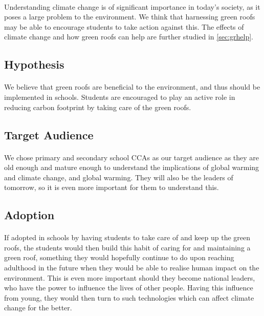 \documentclass[a4paper]{article}
\begin{document}
\begin{multicols}{2}
  \paragraph{} Understanding climate change is of significant importance
  in today's society, as it poses a large problem to the environment.
  We think that harnessing green roofs may be able to encourage students
  to take action against this. The effects of climate change and how green
  roofs can help are further studied in \cref{sec:grhelp}.

  \subsection{Hypothesis}
  \paragraph{} We believe that green roofs are beneficial to the
  environment, and thus should be implemented in schools. Students are
  encouraged to play an active role in reducing carbon footprint by
  taking care of the green roofs.
  \subsection{Target Audience} \label{ssec:target-aud}
  \paragraph{} We chose primary and secondary school CCAs as our target audience as
  they are old enough and mature enough to understand the implications
  of global warming and climate change, and global warming. They will
  also be the leaders of tomorrow, so it is even more important for them
  to understand this.


  \subsection{Adoption}
  \paragraph{} If adopted in schools by having students to take care
  of and keep up the green roofs, the students would then build this
  habit of caring for and maintaining a green roof, something they would
  hopefully continue to do upon reaching adulthood in the future when
  they would be able to realise human impact on the environment. This is
  even more important should they become national leaders, who have the
  power to influence the lives of other people. Having this influence
  from young, they would then turn to such technologies which can affect
  climate change for the better.


\end{multicols}
\end{document}
